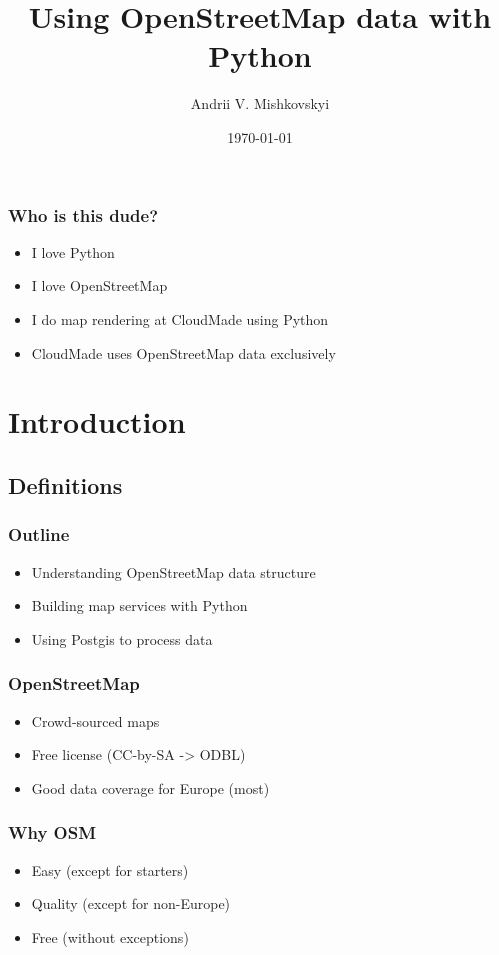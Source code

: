 \documentclass[14pt]{beamer}
\title{Using OpenStreetMap data with Python}
\author{Andrii V. Mishkovskyi}
\date{\today}
\begin{document}
\begin{frame}
  \titlepage
\end{frame}

\begin{frame}
  \frametitle{Who is this dude?}
  \begin{itemize}
  \item I love Python
  \item I love OpenStreetMap
  \item I do map rendering at CloudMade using Python
  \item CloudMade uses OpenStreetMap data exclusively
  \end{itemize}
\end{frame}

\begin{frame}
  \tableofcontents
\end{frame}

\section{Introduction}

\subsection{Definitions}
\label{sec:definitions}

\begin{frame}
  \frametitle{Outline}
  \begin{itemize}
  \item Understanding OpenStreetMap data structure
  \item Building map services with Python
  \item Using Postgis to process data
  \end{itemize}
\end{frame}

\begin{frame}
  \frametitle{OpenStreetMap}
  \begin{itemize}
  \item Crowd-sourced maps
  \item Free license (CC-by-SA -> ODBL)
  \item Good data coverage for Europe (most)
  \end{itemize}
\end{frame}

\begin{frame}
  \frametitle{Why OSM}
  \begin{itemize}
  \item Easy (except for starters)
  \item Quality (except for non-Europe)
  \item Free (without exceptions)
  \end{itemize}
\end{frame}
\end{document}
